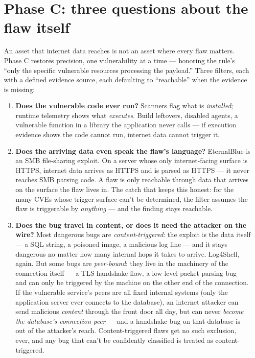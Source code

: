 \documentclass[11pt]{article}
\begin{document}
\section*{Phase C: three questions about the flaw itself}
An asset that internet data reaches is not an asset where every flaw matters.
Phase C restores precision, one vulnerability at a time --- honoring the rule's
``only the specific vulnerable resources processing the payload.'' Three filters,
each with a defined evidence source, each defaulting to ``reachable'' when the
evidence is missing:

\begin{enumerate}[leftmargin=1.8em]
\item \textbf{Does the vulnerable code ever run?} Scanners flag what is
  \emph{installed}; runtime telemetry shows what \emph{executes}. Build leftovers,
  disabled agents, a vulnerable function in a library the application never calls
  --- if execution evidence shows the code cannot run, internet data cannot
  trigger it.
\item \textbf{Does the arriving data even speak the flaw's language?} EternalBlue
  is an SMB file-sharing exploit. On a server whose only internet-facing surface
  is HTTPS, internet data arrives as HTTPS and is parsed as HTTPS --- it never
  reaches SMB parsing code. A flaw is only reachable through data that arrives on
  the surface the flaw lives in. The catch that keeps this honest: for the many
  CVEs whose trigger surface can't be determined, the filter assumes the flaw is
  triggerable by \emph{anything} --- and the finding stays reachable.
\item \textbf{Does the bug travel in content, or does it need the attacker on the
  wire?} Most dangerous bugs are \emph{content-triggered}: the exploit is the data
  itself --- a SQL string, a poisoned image, a malicious log line --- and it stays
  dangerous no matter how many internal hops it takes to arrive. Log4Shell,
  again. But some bugs are \emph{peer-bound}: they live in the machinery of the
  connection itself --- a TLS handshake flaw, a low-level packet-parsing bug ---
  and can only be triggered by the machine on the other end of the connection.
  If the vulnerable service's peers are all fixed internal systems (only the
  application server ever connects to the database), an internet attacker can
  send malicious \emph{content} through the front door all day, but can never
  \emph{become the database's connection peer} --- and a handshake bug on that
  database is out of the attacker's reach. Content-triggered flaws get no such
  exclusion, ever, and any bug that can't be confidently classified is treated as
  content-triggered.
\end{enumerate}
\end{document}
